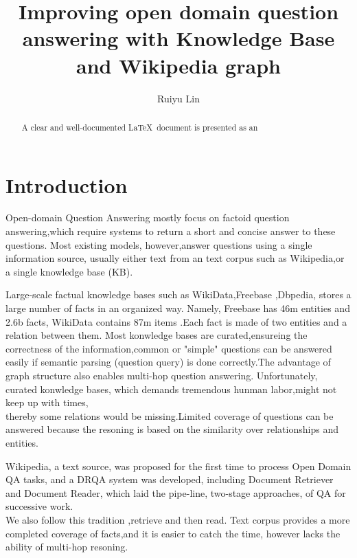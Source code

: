 \documentclass[sigconf]{acmart}
\begin{document}
	
	\title{Improving open domain question answering with Knowledge Base and Wikipedia graph}
	
	\author{Ruiyu Lin}
	
	
	\begin{abstract}
		A clear and well-documented \LaTeX\ document is presented as an
		
	\end{abstract}


	\maketitle
	
	\section{Introduction}
		Open-domain  Question Answering mostly focus on factoid question answering,which require systems to return a short and concise answer to these questions.
		Most existing models, however,answer questions using a single information
		source, usually either text from an text corpus such as Wikipedia\cite{chen2017reading},or a single knowledge base (KB).	
		
		Large-scale factual knowledge bases such as WikiData\cite{vrandevcic2014wikidata},Freebase \cite{bollacker2008freebase},Dbpedia\cite{auer2007dbpedia}, stores a large number of facts in an organized way. Namely, Freebase has 46m entities and 2.6b facts, WikiData contains 87m items .Each fact is made of two entities and a relation between them. Most konwledge bases are curated,ensureing the correctness of the information,common or "simple" questions can be answered easily if semantic parsing (question query)  is done correctly.The advantage of graph structure also enables multi-hop question answering.
		Unfortunately, curated konwledge bases, which demands tremendous hunman labor,might not keep up with times,\\thereby some relations would be missing.Limited coverage of questions  can be answered because the resoning is based on the similarity over relationships and entities.	
		
		Wikipedia\cite{chen2017reading}, a text source, was proposed for the first time to process Open Domain QA tasks, and a DRQA system was developed, including Document Retriever and Document Reader, which laid the pipe-line, two-stage approaches, of QA for successive work.\\We also follow this tradition ,retrieve and then read. 		
		Text corpus provides a more completed coverage of facts,and it is easier to catch the time, however lacks the ability of multi-hop resoning.
		
\end{document}
